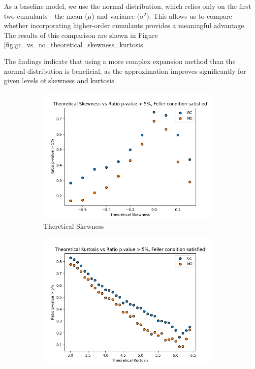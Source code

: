 As a baseline model, we use the normal distribution, which relies only on the first two cumulants—the mean ($\mu$) and variance ($\sigma^2$). This allows us to compare whether incorporating higher-order cumulants provides a meaningful advantage. The results of this comparison are shown in Figure \ref{fig:gc_vs_no_theoretical_skewness_kurtosis}.

The findings indicate that using a more complex expansion method than the normal distribution is beneficial, as the approximation improves significantly for given levels of skewness and kurtosis.

\begin{figure}
    \centering
    \begin{subfigure}[b]{0.49\textwidth}
        \centering
        \includegraphics[width=\textwidth]{img/theoretical_skewness_vs_ratio_feller_condition_true.png}
        \caption{Theretical Skewness}
    \end{subfigure}
    \hfill
    \begin{subfigure}[b]{0.49\textwidth}
        \centering
        \includegraphics[width=\textwidth]{img/theoretical_kurtosis_vs_ratio_feller_condition_true.png}

\end{subfigure}
\end{figure}
